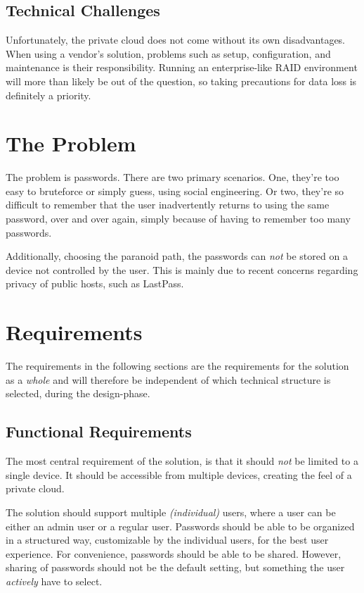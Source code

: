 		\subsection*{Technical Challenges}
			Unfortunately, the private cloud does not come without its own disadvantages. When using a vendor's solution, problems such as setup, configuration, and maintenance is their responsibility. Running an enterprise-like RAID environment will more than likely be out of the question, so taking precautions for data loss is definitely a priority.

	\section{The Problem}
		\label{chap:intro_sec:problem}
		The problem is passwords. There are two primary scenarios. One, they're too easy to bruteforce or simply guess, using social engineering. Or two, they're so difficult to remember that the user inadvertently returns to using the same password, over and over again, simply because of having to remember too many passwords. 

		Additionally, choosing the paranoid path, the passwords can \emph{not} be stored on a device not controlled by the user. This is mainly due to recent concerns regarding privacy of public hosts, such as LastPass.

	\section{Requirements}
		\label{sec:requirements}
		The requirements in the following sections are the requirements for the solution as a \emph{whole} and will therefore be independent of which technical structure is selected, during the design-phase.



		\subsection*{Functional Requirements}
			The most central requirement of the solution, is that it should \emph{not} be limited to a single device. It should be accessible from multiple devices, creating the feel of a private cloud. 

			The solution should support multiple \emph{(individual)} users, where a user can be either an admin user or a regular user. Passwords should be able to be organized in a structured way, customizable by the individual users, for the best user experience. For convenience, passwords should be able to be shared. However, sharing of passwords should not be the default setting, but something the user \emph{actively} have to select.

